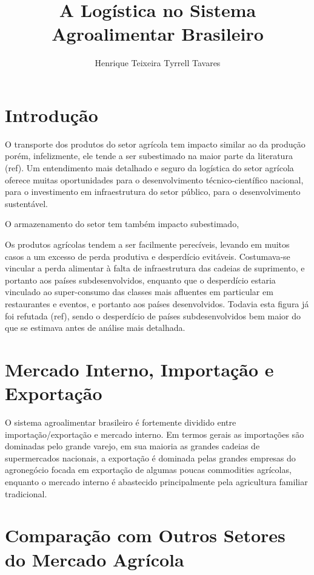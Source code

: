 \documentclass[]{article}
\title{A Logística no Sistema Agroalimentar Brasileiro}
\author{Henrique Teixeira Tyrrell Tavares}
\begin{document}
	
	\maketitle
	
	\begin{abstract}
		
	\end{abstract}
	
	\section{Introdução}

		O transporte dos produtos do setor agrícola tem impacto similar ao da produção porém, infelizmente, ele tende a ser subestimado na maior parte da literatura (ref). Um entendimento mais detalhado e seguro da logística do setor agrícola oferece muitas oportunidades para o desenvolvimento técnico-científico nacional, para o investimento em infraestrutura do setor público, para o desenvolvimento sustentável.
		
		O armazenamento do setor tem também impacto subestimado, 
		
		Os produtos agrícolas tendem a ser facilmente perecíveis, levando em muitos casos a um excesso de perda produtiva e desperdício evitáveis. Costumava-se vincular a perda alimentar à falta de infraestrutura das cadeias de suprimento, e portanto aos países subdesenvolvidos, enquanto que o desperdício estaria vinculado ao super-consumo das classes mais afluentes em particular em restaurantes e eventos, e portanto aos países desenvolvidos. Todavia esta figura já foi refutada (ref), sendo o desperdício de países subdesenvolvidos bem maior do que se estimava antes de análise mais detalhada. 
	
	\section{Mercado Interno, Importação e Exportação}
	
		O sistema agroalimentar brasileiro é fortemente dividido entre importação/exportação e mercado interno. Em termos gerais as importações são dominadas pelo grande varejo, em sua maioria as grandes cadeias de supermercados nacionais, a exportação é dominada pelas grandes empresas do agronegócio focada em exportação de algumas poucas commodities agrícolas, enquanto o mercado interno é abastecido principalmente pela agricultura familiar tradicional. 
	

	\section{Comparação com Outros Setores do Mercado Agrícola}
\end{document}

